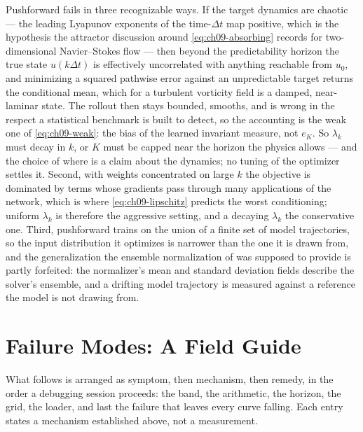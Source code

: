Pushforward fails in three recognizable ways. If the target dynamics are chaotic --- the
leading Lyapunov exponents of the time-$\Delta t$ map positive, which is the hypothesis the
attractor discussion around
\eqref{eq:ch09-absorbing} records for two-dimensional Navier--Stokes flow --- then beyond the
predictability horizon the true state
$u(k\Delta t)$
is effectively uncorrelated with anything reachable from $u_0$, and minimizing a squared
pathwise error against an unpredictable target returns the conditional mean, which for a
turbulent vorticity field is a damped, near-laminar state. The rollout then stays bounded,
smooths, and is wrong in the respect a statistical benchmark is built to detect, so the
accounting is the weak one of
\eqref{eq:ch09-weak}: the bias of the learned invariant measure, not $e_K$. So $\lambda_k$
must decay in $k$, or $K$ must be capped near the horizon the physics allows --- and the
choice of where is a claim about the dynamics; no tuning of the optimizer settles it. Second, with weights
concentrated on large $k$ the objective is dominated by terms whose gradients pass through
many applications of the network, which is where \eqref{eq:ch09-lipschitz} predicts the
worst conditioning; uniform $\lambda_k$ is therefore the aggressive setting, and a decaying
$\lambda_k$ the conservative one. Third, pushforward trains on the union of a finite
set of model trajectories, so the
input distribution it optimizes is narrower than the one it is drawn from, and the
generalization the ensemble normalization of
 was supposed to provide is
partly forfeited: the normalizer's mean and standard deviation fields describe the solver's
ensemble, and a drifting model trajectory is measured against a reference the model is not
drawing from. 

\section{Failure Modes: A Field Guide}
\label{sec:ch26-failures}

What follows is arranged as symptom, then mechanism, then remedy, in the order a debugging
session proceeds: the band, the arithmetic, the horizon, the grid, the loader, and last the
failure that leaves every curve falling. Each entry
states a mechanism established above, not a measurement. 

